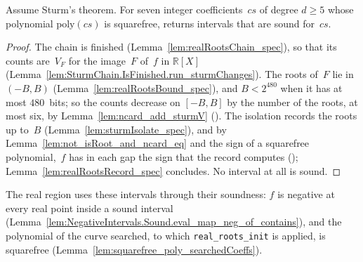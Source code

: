 \begin{lemma}\label{lem:realRootsInit_spec}
  \leanok
  Assume Sturm's theorem. For seven integer coefficients~$cs$ of degree $d \ge 5$ whose polynomial
  $\mathrm{poly}(cs)$ is squarefree,  returns intervals that are sound
  for~$cs$.
\end{lemma}

\begin{proof}
  \leanok
  The chain is finished (Lemma~\ref{lem:realRootsChain_spec}), so that its counts are~$V_F$ for the
  image~$F$ of~$f$ in $\mathbb{R}[X]$ (Lemma~\ref{lem:SturmChain.IsFinished.run_sturmChanges}). The
  roots of~$F$ lie in $(-B, B)$ (Lemma~\ref{lem:realRootsBound_spec}), and $B < 2^{480}$ when it
  has at most $480$~bits; so the counts decrease on $[-B, B]$ by the number of the roots, at most
  six, by Lemma~\ref{lem:ncard_add_sturmV} (). The
  isolation records the roots up to~$B$ (Lemma~\ref{lem:sturmIsolate_spec}), and by
  Lemma~\ref{lem:not_isRoot_and_ncard_eq} and the sign of a squarefree polynomial,~$f$ has in each
  gap the sign that the record computes ();
  Lemma~\ref{lem:realRootsRecord_spec} concludes. No interval at all is sound.
\end{proof}

The real region uses these intervals through their soundness: $f$ is negative at every real point
inside a sound interval (Lemma~\ref{lem:NegativeIntervals.Sound.eval_map_neg_of_contains}), and the
polynomial of the curve searched, to which \texttt{real\_roots\_init} is applied, is squarefree
(Lemma~\ref{lem:squarefree_poly_searchedCoeffs}).
